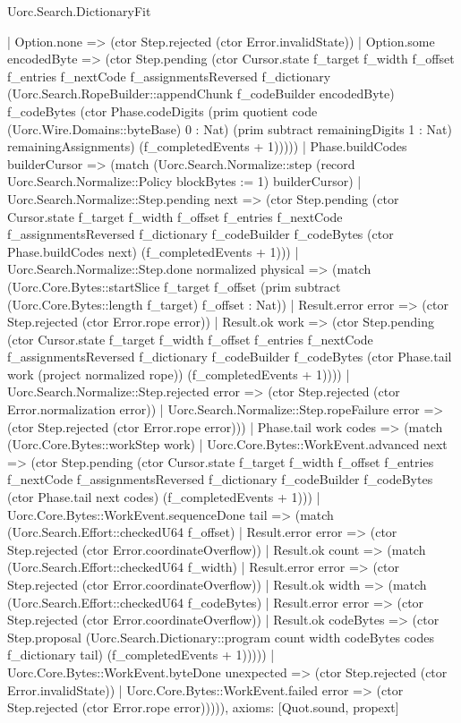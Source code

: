 \begin{lexlean}{Uorc.Search.DictionaryFit}
\begin{semanticmodule}
{        | Option.none => (ctor Step.rejected (ctor Error.invalidState))
        | Option.some encodedByte => (ctor Step.pending (ctor Cursor.state f_target f_width f_offset f_entries f_nextCode f_assignmentsReversed f_dictionary (Uorc.Search.RopeBuilder::appendChunk f_codeBuilder encodedByte) f_codeBytes (ctor Phase.codeDigits (prim quotient code (Uorc.Wire.Domains::byteBase) 0 : Nat) (prim subtract remainingDigits 1 : Nat) remainingAssignments) (f_completedEvents + 1)))))
      | Phase.buildCodes builderCursor => (match (Uorc.Search.Normalize::step (record Uorc.Search.Normalize::Policy {blockBytes := 1}) builderCursor)
        | Uorc.Search.Normalize::Step.pending next => (ctor Step.pending (ctor Cursor.state f_target f_width f_offset f_entries f_nextCode f_assignmentsReversed f_dictionary f_codeBuilder f_codeBytes (ctor Phase.buildCodes next) (f_completedEvents + 1)))
        | Uorc.Search.Normalize::Step.done normalized physical => (match (Uorc.Core.Bytes::startSlice f_target f_offset (prim subtract (Uorc.Core.Bytes::length f_target) f_offset : Nat))
          | Result.error error => (ctor Step.rejected (ctor Error.rope error))
          | Result.ok work => (ctor Step.pending (ctor Cursor.state f_target f_width f_offset f_entries f_nextCode f_assignmentsReversed f_dictionary f_codeBuilder f_codeBytes (ctor Phase.tail work (project normalized rope)) (f_completedEvents + 1))))
        | Uorc.Search.Normalize::Step.rejected error => (ctor Step.rejected (ctor Error.normalization error))
        | Uorc.Search.Normalize::Step.ropeFailure error => (ctor Step.rejected (ctor Error.rope error)))
      | Phase.tail work codes => (match (Uorc.Core.Bytes::workStep work)
        | Uorc.Core.Bytes::WorkEvent.advanced next => (ctor Step.pending (ctor Cursor.state f_target f_width f_offset f_entries f_nextCode f_assignmentsReversed f_dictionary f_codeBuilder f_codeBytes (ctor Phase.tail next codes) (f_completedEvents + 1)))
        | Uorc.Core.Bytes::WorkEvent.sequenceDone tail => (match (Uorc.Search.Effort::checkedU64 f_offset)
          | Result.error error => (ctor Step.rejected (ctor Error.coordinateOverflow))
          | Result.ok count => (match (Uorc.Search.Effort::checkedU64 f_width)
            | Result.error error => (ctor Step.rejected (ctor Error.coordinateOverflow))
            | Result.ok width => (match (Uorc.Search.Effort::checkedU64 f_codeBytes)
              | Result.error error => (ctor Step.rejected (ctor Error.coordinateOverflow))
              | Result.ok codeBytes => (ctor Step.proposal (Uorc.Search.Dictionary::program count width codeBytes codes f_dictionary tail) (f_completedEvents + 1)))))
        | Uorc.Core.Bytes::WorkEvent.byteDone unexpected => (ctor Step.rejected (ctor Error.invalidState))
        | Uorc.Core.Bytes::WorkEvent.failed error => (ctor Step.rejected (ctor Error.rope error))))),
  axioms: [Quot.sound, propext]
}


\end{semanticmodule}
\end{lexlean}
